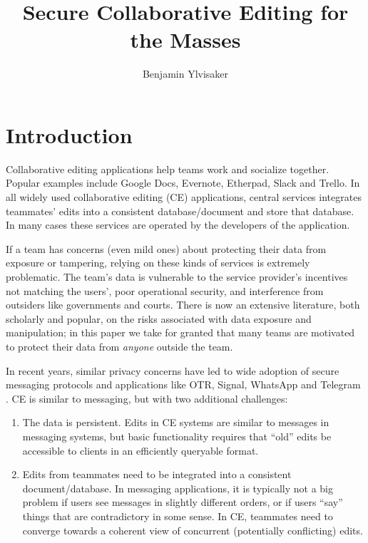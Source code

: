 \documentclass{article}
\begin{document}
\title{Secure Collaborative Editing for the Masses}
\author{Benjamin Ylvisaker}

\maketitle

\section{Introduction}

Collaborative editing applications help teams work and socialize together.
Popular examples include Google Docs, Evernote, Etherpad, Slack and Trello.
In all widely used collaborative editing (CE) applications, central services integrates teammates' edits into a consistent database/document and store that database.
In many cases these services are operated by the developers of the application.

If a team has concerns (even mild ones) about protecting their data from exposure or tampering, relying on these kinds of services is extremely problematic.
The team's data is vulnerable to the service provider's incentives not matching the users', poor operational security, and interference from outsiders like governments and courts.
There is now an extensive literature, both scholarly and popular, on the risks associated with data exposure and manipulation; in this paper we take for granted that many teams are motivated to protect their data from \emph{anyone} outside the team.

In recent years, similar privacy concerns have led to wide adoption of secure messaging protocols and applications like OTR, Signal, WhatsApp and Telegram \cite{}.
CE is similar to messaging, but with two additional challenges:
\begin{enumerate}
\item The data is persistent.
  Edits in CE systems are similar to messages in messaging systems, but basic functionality requires that ``old'' edits be accessible to clients in an efficiently queryable format.
\item Edits from teammates need to be integrated into a consistent document{\slash}database.
  In messaging applications, it is typically not a big problem if users see messages in slightly different orders, or if users ``say'' things that are contradictory in some sense.
  In CE, teammates need to converge towards a coherent view of concurrent (potentially conflicting) edits.
\end{enumerate}
\end{document}

